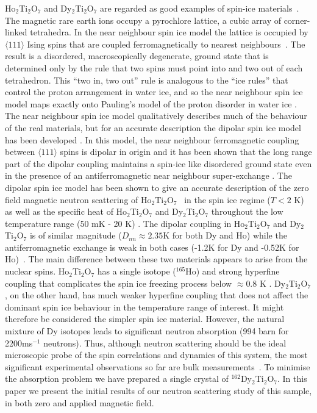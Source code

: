 \documentclass[global,twocolumn]{svjour}
\begin{document}
Ho$_2$Ti$_2$O$_7$ and Dy$_2$Ti$_2$O$_7$ 
are regarded as good examples of
spin-ice materials~\cite{prl1,newprl,art}. 
The magnetic rare earth ions
occupy a pyrochlore lattice, a cubic array of corner-linked tetrahedra. 
In the near neighbour spin ice model the lattice is occupied by 
$\langle 111 \rangle$ Ising spins that are coupled ferromagnetically 
to nearest neighbours~\cite{jpcm}.  The result is a disordered, 
macroscopically degenerate, ground state that is determined only by the rule
that two spins must point into and two out of each tetrahedron. 
This ``two in, two out'' rule is analogous to the ``ice rules'' 
that control
the proton arrangement in
water ice, and so the near neighbour 
spin ice model maps exactly onto 
Pauling's model of the proton disorder in water ice \cite{jpcm,pauling}. 
The near neighbour spin ice model qualitatively describes much of the
behaviour of the real materials, but for an accurate description the dipolar
spin ice model has been developed \cite{byron}. 
In this model,
the near neighbour ferromagnetic coupling 
between $\langle 111 \rangle$ spins is dipolar in origin
and it has been shown that the long range part of the dipolar 
coupling maintains a spin-ice like disordered ground state 
even in the presence of an antiferromagnetic near neighbour 
super-exchange \cite{byron}. 
The dipolar spin ice model has been 
shown to give an accurate description of the zero field 
magnetic neutron scattering of Ho$_2$Ti$_2$O$_7$~\cite{newprl} in the spin ice
regime ($T < 2$ K) as well as
the specific heat of Ho$_2$Ti$_2$O$_7$ and Dy$_2$Ti$_2$O$_7$ throughout the
low temperature range (50 mK - 20 K) \cite{newprl,byron}.  The dipolar 
coupling in Ho$_2$Ti$_2$O$_7$ and Dy$_2$Ti$_2$O$_7$ is 
of similar magnitude 
($D_{nn}\approx2.35$K for both Dy and Ho) while 
the antiferromagnetic exchange is weak in both cases  
(-1.2K for Dy and -0.52K for Ho)~\cite{newprl,byron}. 
The main difference between these two materials appears 
to arise from the nuclear spins. Ho$_2$Ti$_2$O$_7$ has a single 
isotope ($^{165}$Ho) and strong hyperfine coupling that complicates the spin 
ice freezing process below $\approx0.8$ K \cite{newprl}. 
Dy$_2$Ti$_2$O$_7$, on the other hand, has much weaker 
hyperfine coupling that does not affect the dominant spin ice behaviour in 
the temperature range of interest. It 
might therefore be considered the simpler spin ice material.  
However, the natural mixture of Dy isotopes leads to 
significant neutron absorption (994 barn for 2200ms$^{-1}$ neutrons).
Thus, although neutron scattering 
should be the ideal microscopic probe of the spin correlations and 
dynamics of this system, 
the most significant experimental observations so far are 
bulk measurements~\cite{art}. To minimise the absorption problem we have 
prepared a single crystal of
$^{162}$Dy$_2$Ti$_2$O$_7$. 
In this paper we present the initial results of our
neutron scattering study of this sample, in both zero and applied 
magnetic field. 
\end{document}
